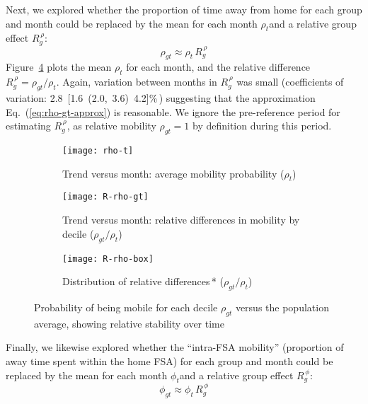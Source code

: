 \par
Next, we explored whether the proportion of time away from home
for each group and month could be replaced by
the mean for each month $\rho_{t}$and a relative group effect $R^{\,\rho}_{g}$:
\begin{equation}\label{eq:rho-gt-approx}
  \rho_{gt} \approx \rho_{t}\,R^{\,\rho}_{g}
\end{equation}
Figure~\ref{fig:rho} plots the mean $\rho_{t}$ for each month,
and the relative difference $R^{\,\rho}_{g} = \rho_{gt} / \rho_{t}$.
Again, variation between months in $R^{\,\rho}_{g}$ was small
(coefficients of variation: 2.8~[1.6~(2.0,~3.6)~4.2]\%\,)
suggesting that the approximation Eq.~(\ref{eq:rho-gt-approx}) is reasonable.
We ignore the pre-\covid reference period for estimating $R^{\,\rho}_{g}$,
as relative mobility $\rho_{gt} = 1$ by definition during this period.
\begin{figure}[ht]
  \begin{subfigure}[t]{0.297\linewidth}
    \texttt{[image: rho-t]}
    \caption{Trend versus month: average mobility probability ($\rho_{t}$)}
    \label{fig:rho-t}
  \end{subfigure}\hfill
  \begin{subfigure}[t]{0.33\linewidth}
    \texttt{[image: R-rho-gt]}
    \caption{Trend versus month: relative differences in mobility by decile ($\rho_{gt} / \rho_{t}$)}
    \label{fig:rho-gt}
  \end{subfigure}\hfill
  \begin{subfigure}[t]{0.33\linewidth}
    \texttt{[image: R-rho-box]}
    \caption{Distribution of relative differences\,* ($\rho_{gt} / \rho_{t}$)}
    \label{fig:rho-box}
  \end{subfigure}
  \caption{Probability of being mobile for each decile $\rho_{gt}$
    versus the population average,
    showing relative stability over time}
  \label{fig:rho}
\end{figure}
\par
Finally, we likewise explored whether the ``intra-FSA mobility''
(proportion of away time spent within the home FSA)
for each group and month could be replaced by
the mean for each month $\phi_{t}$and a relative group effect $R^{\,\phi}_{g}$:
\begin{equation}\label{eq:phi-gt-approx}
  \phi_{gt} \approx \phi_{t}\,R^{\,\phi}_{g}
\end{equation}
